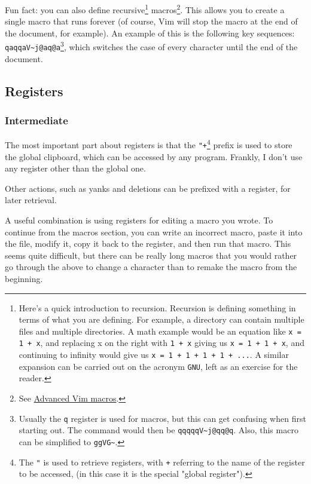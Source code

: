 \documentclass[11pt]{article}
\begin{document}
Fun fact: you can also define recursive\footnote{Here's a quick introduction to recursion. Recursion is defining 
something in terms of what you are defining. For example, a directory 
can contain multiple files and multiple directories. A math example 
would be an equation like \texttt{x = 1 + x}, and replacing x on the right with
\texttt{1 + x} giving us \texttt{x = 1 + 1 + x}, and continuing to infinity would give
us \texttt{x = 1 + 1 + 1 + 1 + ...}. A similar expansion can be carried out 
on the acronym \texttt{GNU}, left as an exercise for the reader.} macros\footnote{See \href{https://sanctum.geek.nz/arabesque/advanced-vim-macros/}{Advanced Vim macros}.}. This
allows you to create a single macro that runs forever (of course, Vim will stop
the macro at the end of the document, for example). An example of this is the
following key sequences: \texttt{qaqqaV\textasciitilde{}j@aq@a}\footnote{Usually the \texttt{q} register is used for macros, but this can get
confusing when first starting out. The command would then be \texttt{qqqqqV\textasciitilde{}j@qq@q}.
Also, this macro can be simplified to \texttt{ggVG\textasciitilde{}}.}, which switches the case of every
character until the end of the document. 
\subsection{Registers}
\label{sec:orgc9f4037}
\subsubsection{Intermediate}
\label{sec:orgd588cb2}
The most important part about registers is that the \texttt{"+}\footnote{The \texttt{"} is used to retrieve registers, with \texttt{+} referring to 
the name of the register to be accessed, (in this case it is the 
special "global register").} prefix is used
to store the global clipboard, which can be accessed by any program. Frankly, I
don't use any register other than the global one.

Other actions, such as yanks and deletions can be prefixed with a register, for
later retrieval.

A useful combination is using registers for editing a macro you wrote. To
continue from the macros section, you can write an incorrect macro, paste it
into the file, modify it, copy it back to the register, and then run that macro.
This seems quite difficult, but there can be really long macros that you would
rather go through the above to change a character than to remake the macro from
the beginning.
\end{document}
